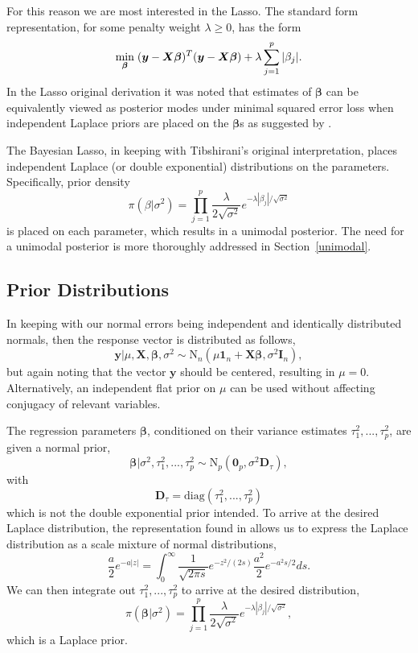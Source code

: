 \documentclass{uwstat572}
\begin{document}
For this reason we are most interested in the Lasso. The standard form representation, for some penalty weight $\lambda \geq 0$, has the form \[
\min_{\boldsymbol{\beta}}  \hspace{.1cm} (\boldsymbol{y}-\boldsymbol{X}\boldsymbol{\beta})^T(\boldsymbol{y}-\boldsymbol{X}\boldsymbol{\beta})+\lambda\sum_{j=1}^p|\beta_j|.
\] In the Lasso original derivation it was noted that estimates of $\boldsymbol\beta$ can be equivalently viewed as posterior modes under minimal squared error loss when independent Laplace priors are placed on the $\boldsymbol{\beta}$s as suggested by \cite{tibshirani1996regression}.

The Bayesian Lasso, in keeping with Tibshirani's original interpretation, places independent Laplace (or double exponential) distributions on the parameters. Specifically, prior density \[
\pi(\beta|\sigma^2)=\prod_{j=1}^p\frac{\lambda}{2\sqrt{\sigma^2}}e^{-\lambda |\beta_j|/\sqrt{\sigma^2}}
\] is placed on each parameter, which results in a unimodal posterior. The need for a unimodal posterior is more thoroughly addressed in Section~\ref{unimodal}.

\subsection{Prior Distributions}
In keeping with our normal errors being independent and identically distributed normals, then the response vector is distributed as follows, \[
\mathbf{y}|\mu,\mathbf{X},\boldsymbol\beta,\sigma^2 \sim \text{N}_n(\mu \mathbf{1}_n+\mathbf{X}\boldsymbol\beta,\sigma^2\mathbf{I}_n), \] but again noting that the vector $\mathbf{y}$ should be centered, resulting in $\mu=0$. Alternatively, an independent flat prior on $\mu$ can be used without affecting conjugacy of relevant variables.

The regression parameters $\boldsymbol\beta$, conditioned on their variance estimates $\tau_1^2,...,\tau_p^2$, are given a normal prior, \[ 
\boldsymbol\beta|\sigma^2,\tau^2_1,...,\tau^2_p\sim\text{N}_p(\mathbf{0}_p,\sigma^2\mathbf{D}_\tau),\] with \[ \mathbf{D}_\tau=\text{diag}(\tau_1^2,...,\tau^2_p) \] which is not the double exponential prior intended. To arrive at the desired Laplace distribution, the representation found in \cite{andrews1974scale} allows us to express the Laplace distribution as a scale mixture of normal distributions, \[ \frac{a}{2}e^{-a|z|}=\int^\infty_0
\frac{1}{\sqrt{2\pi s}}e^{-z^2/(2s)}\frac{a^2}{2}e^{-a^2s/2}ds.\] We can then integrate out $\tau^2_1,...,\tau^2_p$ to arrive at the desired distribution, \[ \pi(\boldsymbol\beta|\sigma^2)=\prod^p_{j=1}\frac{\lambda}{2\sqrt{\sigma^2}}e^{-\lambda|\beta_j|/\sqrt{\sigma^2}}, \] which is a Laplace prior. 
\end{document}
